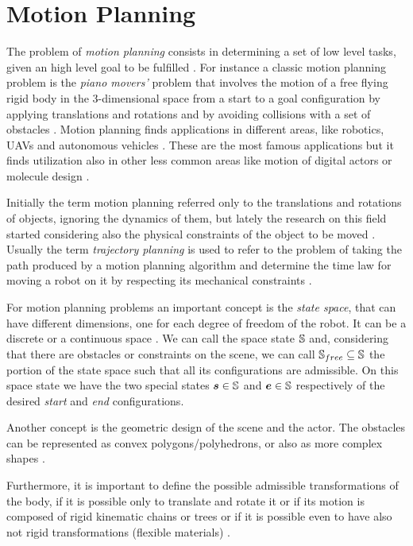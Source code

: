 \documentclass[dissertation.tex]{subfiles}
\begin{document}
\chapter{Motion Planning}
The problem of \emph{motion planning} consists in determining a set of
low level tasks, given an high level goal to be fulfilled
\cite{choset}. For instance a classic motion planning problem is the
\emph{piano movers'} problem that involves the motion of a free flying rigid 
body in the 3-dimensional space
 from a start to a goal configuration by applying
translations and rotations and by avoiding collisions with a set
of obstacles \cite{choset}\cite{lavalle}. Motion planning finds
applications in 
different areas, like robotics, \acp{UAV} \cite{goerzen} and autonomous
vehicles \cite{paden}. These are the most
famous applications but it finds utilization also in other less
common areas like motion of digital actors or molecule design
\cite{choset}.

Initially the term motion planning referred only to the translations
and rotations of objects, ignoring the dynamics of them, but lately
the research on this field started considering also the physical
constraints of the object to be moved \cite{lavalle}. Usually the term
\emph{trajectory planning} is used to refer to the problem of taking
the path produced by a
motion planning algorithm and determine the time law for moving a
robot on it by
respecting its mechanical constraints \cite{lavalle}.

For motion planning problems an important concept is the \emph{state
  space},
that can have different dimensions, one for each degree of freedom of
the robot. It can be a discrete or a continuous space
\cite{lavalle}. We can call the space state $\mathbb{S}$
and, considering that there are obstacles or constraints on the scene,
we can call $\mathbb{S}_{free}\subseteq\mathbb{S}$
the portion of the state space such that all its configurations
are admissible. On this space state we have
the two special states $\boldsymbol{s}\in\mathbb{S}$ and $\boldsymbol{e}\in\mathbb{S}$ respectively of the
desired \emph{start} and \emph{end} configurations.

Another concept is the geometric design of the scene and the
actor. The obstacles can be represented as convex
polygons/polyhedrons, or also as more complex
shapes \cite{lavalle}.

Furthermore, it is important to define the possible admissible
transformations of the body, if it is 
possible only to translate and rotate it or if its motion is composed of
rigid kinematic chains or trees or if it is possible even to have also not
rigid transformations (flexible materials) \cite{lavalle}.
\end{document}
